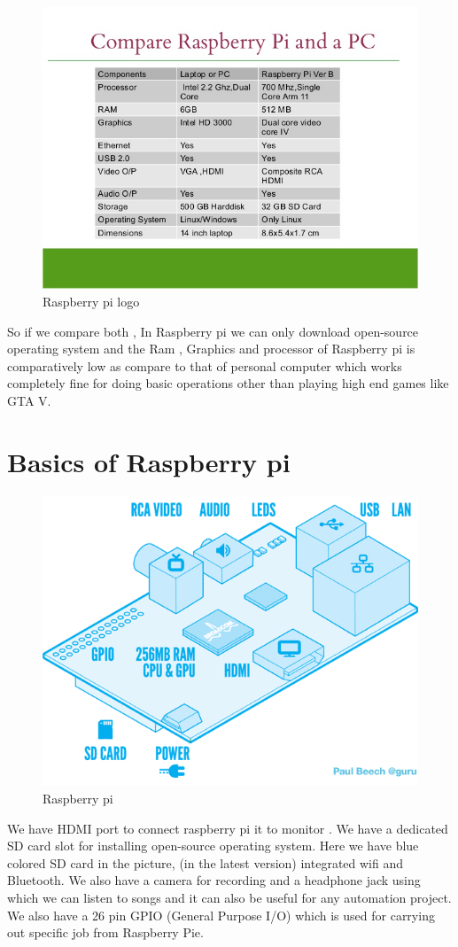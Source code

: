 \begin{figure}[ht]
\centering
\includegraphics[scale=0.3]{images/rasp-2.png}
\caption{Raspberry pi logo}
\end{figure}
So if we compare both , In Raspberry pi we can only download open-source operating system and the Ram , Graphics and processor of Raspberry pi is comparatively low as compare to that of personal computer which works completely fine for doing basic operations other than playing high end games like GTA V.
\section{Basics of Raspberry pi}
\begin{figure}[ht]
\centering
\includegraphics[scale=0.3]{images/rasp3.png}
\caption{Raspberry pi}
\end{figure}
We have HDMI port to connect raspberry pi it to monitor . We have a dedicated SD card slot for installing open-source operating system. Here we have  blue colored SD card in the picture, (in the latest version) integrated wifi and Bluetooth.
We also have a camera for recording and a headphone jack using which we can listen to songs and it  can also be useful for any automation project. We also have a 26 pin GPIO (General Purpose I/O) which is used for carrying out  specific job from  Raspberry Pie.

